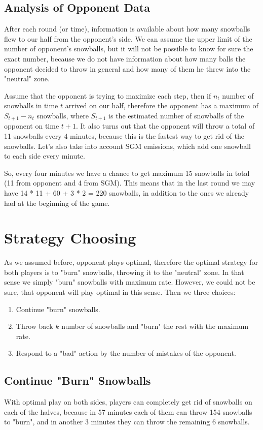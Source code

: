 \documentclass[conference]{IEEEtran}
\begin{document}
\subsection{Analysis of Opponent Data}
After each round (or time), information is available about how many snowballs flew to our half from the opponent's side. We can assume the upper limit of the number of opponent's snowballs, but it will not be possible to know for sure the exact number, because we do not have information about how many balls the opponent decided to throw in general and how many of them he threw into the "neutral" zone.

Assume that the opponent is trying to maximize each step, then if $n_t$ number of snowballs in time $t$ arrived on our half, therefore the opponent has a maximum of $S_{t+1} - n_t$ snowballs, where $S_{t+1}$ is the estimated number of snowballs of the opponent on time $t+1$. It also turns out that the opponent will throw a total of 11 snowballs every 4 minutes, because this is the fastest way to get rid of the snowballs. Let's also take into account SGM emissions, which add one snowball to each side every minute.

So, every four minutes we have a chance to get maximum 15 snowballs in total (11 from opponent and 4 from SGM). This means that in the last round we may have 14 * 11 + 60 + 3 * 2 = 220 snowballs, in addition to the ones we already had at the beginning of the game.

\section{Strategy Choosing}

As we assumed before, opponent plays optimal, therefore the optimal strategy for both players is to "burn" snowballs, throwing it to the "neutral" zone. In that sense we simply "burn" snowballs with maximum rate. However, we could not be sure, that opponent will play optimal in this sense. Then we three choices:
\begin{enumerate}
\item Continue "burn" snowballs.
\item Throw back $k$ number of snowballs and "burn" the rest with the maximum rate.
\item Respond to a "bad" action by the number of mistakes of the opponent.
\end{enumerate}

\subsection{Continue "Burn" Snowballs}
With optimal play on both sides, players can completely get rid of snowballs on each of the halves, because in 57 minutes each of them can throw 154 snowballs to "burn", and in another 3 minutes they can throw the remaining 6 snowballs.
\end{document}
